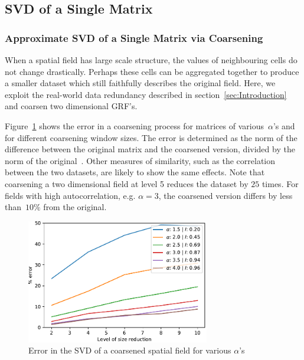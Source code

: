 \documentclass[ijgi,article,submit,moreauthors,pdftex,10pt,a4paper]{Definitions/mdpi}
\begin{document}

\subsection{SVD of a Single Matrix} %
\label{sec:Results/SVD of a Single Matrix}
\subsubsection{Approximate SVD of a Single Matrix via Coarsening}
\label{sec:Results/Approximate SVD of a Single Matrix via Coarsening}

When a spatial field has large scale structure, the values of neighbouring cells do not change drastically. Perhaps these cells can be aggregated together to produce a smaller dataset which still faithfully describes the original field. Here, we exploit the real-world data redundancy described in section~\ref{sec:Introduction} and coarsen two dimensional GRF's.

Figure~\ref{fig:plotSingleSpatialFieldViaCoarsening} shows the error in a coarsening process for matrices of various~$\alpha$'s and for different coarsening window sizes. The error is determined as the norm of the difference between the original matrix and the coarsened version, divided by the norm of the original~\cite{Bogaardt2018}. Other measures of similarity, such as the correlation between the two datasets, are likely to show the same effects. %
Note that coarsening a two dimensional field at level 5 reduces the dataset by $25$ times. For fields with high autocorrelation, e.g. $\alpha=3$, the coarsened version differs by less than~$10\%$ from the original.

\begin{figure}[H]
\centering
\includegraphics[width=80mm]{Results/plotSingleSpatialFieldViaCoarsening.pdf}
\caption[Error after coarsening]{Error in the SVD of a coarsened spatial field for various $\alpha$'s}
\label{fig:plotSingleSpatialFieldViaCoarsening}
\end{figure}
\end{document}
